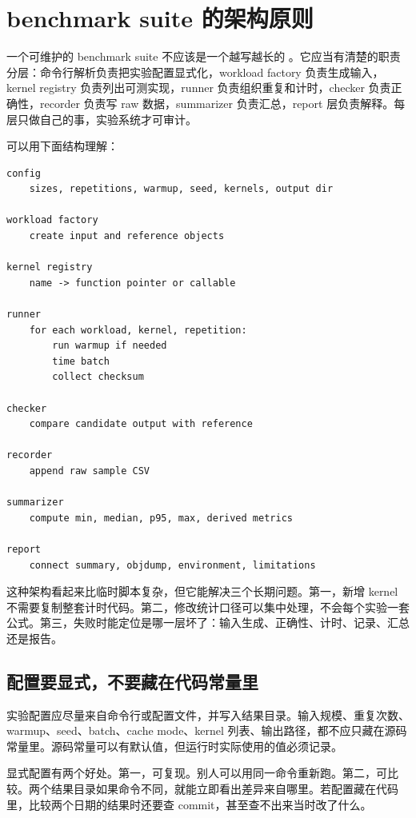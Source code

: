 \section{benchmark suite 的架构原则}

一个可维护的 benchmark suite 不应该是一个越写越长的 。它应当有清楚的职责分层：命令行解析负责把实验配置显式化，workload factory 负责生成输入，kernel registry 负责列出可测实现，runner 负责组织重复和计时，checker 负责正确性，recorder 负责写 raw 数据，summarizer 负责汇总，report 层负责解释。每层只做自己的事，实验系统才可审计。

可以用下面结构理解：

\begin{lstlisting}
config
    sizes, repetitions, warmup, seed, kernels, output dir

workload factory
    create input and reference objects

kernel registry
    name -> function pointer or callable

runner
    for each workload, kernel, repetition:
        run warmup if needed
        time batch
        collect checksum

checker
    compare candidate output with reference

recorder
    append raw sample CSV

summarizer
    compute min, median, p95, max, derived metrics

report
    connect summary, objdump, environment, limitations
\end{lstlisting}

这种架构看起来比临时脚本复杂，但它能解决三个长期问题。第一，新增 kernel 不需要复制整套计时代码。第二，修改统计口径可以集中处理，不会每个实验一套公式。第三，失败时能定位是哪一层坏了：输入生成、正确性、计时、记录、汇总还是报告。

\subsection{配置要显式，不要藏在代码常量里}

实验配置应尽量来自命令行或配置文件，并写入结果目录。输入规模、重复次数、warmup、seed、batch、cache mode、kernel 列表、输出路径，都不应只藏在源码常量里。源码常量可以有默认值，但运行时实际使用的值必须记录。

显式配置有两个好处。第一，可复现。别人可以用同一命令重新跑。第二，可比较。两个结果目录如果命令不同，就能立即看出差异来自哪里。若配置藏在代码里，比较两个日期的结果时还要查 commit，甚至查不出来当时改了什么。

